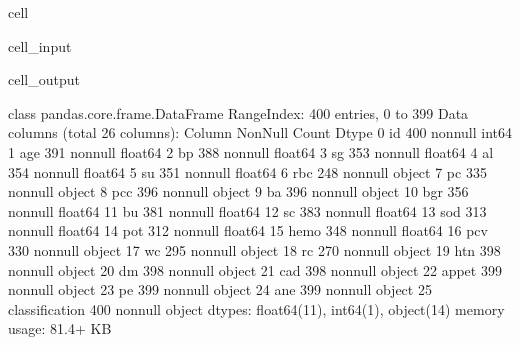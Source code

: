 \documentclass[letterpaper,10pt,french]{sphinxmanual}
\begin{document}
\begin{sphinxuseclass}{cell}
\begin{sphinxuseclass}{cell_input}
\begin{sphinxVerbatim}[commandchars=\\\{\}]
\end{sphinxVerbatim}

\end{sphinxuseclass}
\begin{sphinxuseclass}{cell_output}
\begin{sphinxVerbatim}[commandchars=\\\{\}]
\PYGZlt{}class \PYGZsq{}pandas.core.frame.DataFrame\PYGZsq{}\PYGZgt{}
RangeIndex: 400 entries, 0 to 399
Data columns (total 26 columns):
 \PYGZsh{}   Column          Non\PYGZhy{}Null Count  Dtype  
\PYGZhy{}\PYGZhy{}\PYGZhy{}  \PYGZhy{}\PYGZhy{}\PYGZhy{}\PYGZhy{}\PYGZhy{}\PYGZhy{}          \PYGZhy{}\PYGZhy{}\PYGZhy{}\PYGZhy{}\PYGZhy{}\PYGZhy{}\PYGZhy{}\PYGZhy{}\PYGZhy{}\PYGZhy{}\PYGZhy{}\PYGZhy{}\PYGZhy{}\PYGZhy{}  \PYGZhy{}\PYGZhy{}\PYGZhy{}\PYGZhy{}\PYGZhy{}  
 0   id              400 non\PYGZhy{}null    int64  
 1   age             391 non\PYGZhy{}null    float64
 2   bp              388 non\PYGZhy{}null    float64
 3   sg              353 non\PYGZhy{}null    float64
 4   al              354 non\PYGZhy{}null    float64
 5   su              351 non\PYGZhy{}null    float64
 6   rbc             248 non\PYGZhy{}null    object 
 7   pc              335 non\PYGZhy{}null    object 
 8   pcc             396 non\PYGZhy{}null    object 
 9   ba              396 non\PYGZhy{}null    object 
 10  bgr             356 non\PYGZhy{}null    float64
 11  bu              381 non\PYGZhy{}null    float64
 12  sc              383 non\PYGZhy{}null    float64
 13  sod             313 non\PYGZhy{}null    float64
 14  pot             312 non\PYGZhy{}null    float64
 15  hemo            348 non\PYGZhy{}null    float64
 16  pcv             330 non\PYGZhy{}null    object 
 17  wc              295 non\PYGZhy{}null    object 
 18  rc              270 non\PYGZhy{}null    object 
 19  htn             398 non\PYGZhy{}null    object 
 20  dm              398 non\PYGZhy{}null    object 
 21  cad             398 non\PYGZhy{}null    object 
 22  appet           399 non\PYGZhy{}null    object 
 23  pe              399 non\PYGZhy{}null    object 
 24  ane             399 non\PYGZhy{}null    object 
 25  classification  400 non\PYGZhy{}null    object 
dtypes: float64(11), int64(1), object(14)
memory usage: 81.4+ KB
\end{sphinxVerbatim}

\end{sphinxuseclass}
\end{sphinxuseclass}
\end{document}
